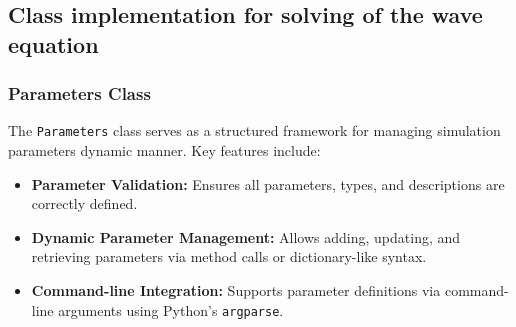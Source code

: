 \documentclass{article}
\begin{document}
		\begin{comment}
		
		\subsection{Key Principles of Object-Oriented Programming}
		\begin{enumerate}
			\item \textbf{Encapsulation} \\
			Encapsulation means grouping data (attributes) and functions (methods) into a class. It hides the details of how the class works and only shows what is needed to use it.
			
			\item \textbf{Inheritance} \\
			Inheritance lets one class (child) use the data and methods of another class (parent). This saves time by reusing existing code.
			
			\item \textbf{Polymorphism} \\
			Polymorphism allows different classes to have methods with the same name but different behaviors.
		\end{enumerate}
			content...
		\end{comment}
		
		\subsection{Class implementation for solving of the wave equation}
		
		\subsubsection{Parameters Class}
		The \texttt{Parameters} class serves as a structured framework for managing simulation parameters dynamic manner. Key features include:
		
		\begin{itemize}
			\item \textbf{Parameter Validation:} Ensures all parameters, types, and descriptions are correctly defined.
			\item \textbf{Dynamic Parameter Management:} Allows adding, updating, and retrieving parameters via method calls or dictionary-like syntax.
			\item \textbf{Command-line Integration:} Supports parameter definitions via command-line arguments using Python's \texttt{argparse}.
		\end{itemize}
		
\end{document}
